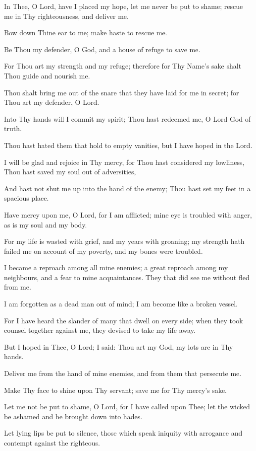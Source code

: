 In Thee, O Lord, have I placed my hope, let me never be put to shame; rescue me in Thy righteousness, and deliver me.

Bow down Thine ear to me; make haste to rescue me.

Be Thou my defender, O God, and a house of refuge to save me.

For Thou art my strength and my refuge; therefore for Thy Name's sake shalt Thou guide and nourish me.

Thou shalt bring me out of the snare that they have laid for me in secret; for Thou art my defender, O Lord.

Into Thy hands will I commit my spirit; Thou hast redeemed me, O Lord God of truth.

Thou hast hated them that hold to empty vanities, but I have hoped in the Lord.

I will be glad and rejoice in Thy mercy, for Thou hast considered my lowliness, Thou hast saved my soul out of adversities,

And hast not shut me up into the hand of the enemy; Thou hast set my feet in a spacious place.

Have mercy upon me, O Lord, for I am afflicted; mine eye is troubled with anger, as is my soul and my body.

For my life is wasted with grief, and my years with groaning; my strength hath failed me on account of my poverty, and my bones were troubled.

I became a reproach among all mine enemies; a great reproach among my neighbours, and a fear to mine acquaintances. They that did see me without fled from me.

I am forgotten as a dead man out of mind; I am become like a broken vessel.

For I have heard the slander of many that dwell on every side; when they took counsel together against me, they devised to take my life away.

But I hoped in Thee, O Lord; I said: Thou art my God, my lots are in Thy hands.

Deliver me from the hand of mine enemies, and from them that persecute me.

Make Thy face to shine upon Thy servant; save me for Thy mercy’s sake.

Let me not be put to shame, O Lord, for I have called upon Thee; let the wicked be ashamed and be brought down into hades.

Let lying lips be put to silence, those which speak iniquity with arrogance and contempt against the righteous.

